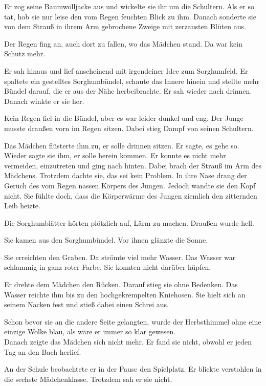 \documentclass[prd,a4paper,12pt,tightenlines,notitlepage,nofootinbib]{revtex4-1}
\begin{document}
Er zog seine Baumwolljacke
aus und wickelte sie ihr um die Schultern.  Als er so tat, hob sie nur
leise den vom Regen feuchten Blick zu ihm.  Danach sonderte sie von dem
Strauß in ihrem Arm gebrochene Zweige mit zerzausten Blüten aus.

Der Regen fing an, auch dort zu fallen, wo das Mädchen stand.
Da war kein Schutz mehr.

Er sah hinaus und lief anscheinend mit irgendeiner Idee zum
Sorghumfeld.  Er spaltete ein gestelltes Sorghumbündel,
schaute das Innere hinein und stellte mehr
Bündel darauf, die er aus der Nähe herbeibrachte.  Er sah wieder nach drinnen.
Danach winkte er sie her.

Kein Regen fiel in die Bündel, aber es war
leider dunkel und eng.  Der Junge musste draußen vorn im Regen
sitzen.  Dabei stieg Dampf von seinen Schultern.

Das Mädchen
flüsterte ihm zu, er solle drinnen sitzen.  Er sagte, es gehe so.  Wieder
sagte sie ihm, er solle herein kommen.  Er konnte es nicht mehr vermeiden,
einzutreten und ging nach hinten.
Dabei brach der Strauß im Arm des
Mädchens.  Trotzdem dachte sie, das sei kein Problem.  In ihre Nase drang
der Geruch des vom Regen nassen Körpers des Jungen.  Jedoch wandte
sie den Kopf nicht.  Sie fühlte doch, dass die Körperwärme des Jungen
ziemlich den zitternden Leib heizte.

Die Sorghumblätter hörten
plötzlich auf, Lärm zu machen.  Draußen wurde hell.

Sie kamen aus
den Sorghumbündel.  Vor ihnen glänzte die Sonne.

Sie
erreichten den Graben.  Da strömte viel mehr Wasser.  Das Wasser war
schlammig in ganz roter Farbe.  Sie konnten nicht darüber hüpfen.

Er
drehte dem Mädchen den Rücken.  Darauf stieg sie ohne Bedenken.  Das
Wasser reichte ihm bis zu den hochgekrempelten Kniehosen.  Sie hielt
sich an seinem Nacken fest und stieß dabei einen Schrei aus.

Schon
bevor sie an die andere Seite gelangten, wurde der Herbsthimmel ohne
eine einzige Wolke blau, als wäre er immer so klar gewesen.
\\

Danach zeigte das Mädchen sich nicht mehr.
Er fand sie nicht, obwohl er jeden Tag an den Bach herlief.

An der Schule beobachtete er in der Pause den Spielplatz.
Er blickte verstohlen in die sechste Mädchenklasse.
Trotzdem sah er sie nicht.
\end{document}
